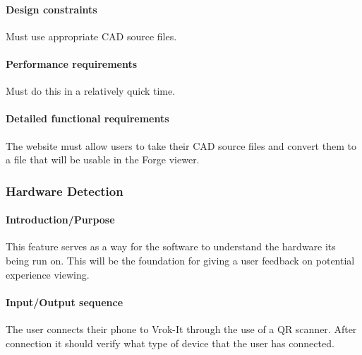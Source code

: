 \documentclass[letterpaper, 10pt, draftclsnofoot, compsoc, onecolumn]{IEEEtran}
\begin{document}
\paragraph[Design constraints]{\rmfamily\bfseries\color{black} Design
constraints }
{\color{black}
	Must use appropriate CAD source files. 
}

\paragraph[Performance requirements]{\rmfamily\bfseries\color{black}
Performance requirements }
{\color{black}
	Must do this in a relatively quick time.
}

\paragraph[Detailed functional requirements]{\rmfamily\bfseries\color{black}
Detailed functional requirements }
{\color{black}
	The website must allow users to take their CAD source files and convert them to a file that will be usable in the
	Forge viewer.    
}


\subsubsection[{Hardware Detection}]{\rmfamily\bfseries\color{black}  
	Hardware Detection
}
\smallskip
\paragraph[Introduction/Purpose of this
feature]{\rmfamily\bfseries\color{black}
Introduction/Purpose }
{\color{black}
	This feature serves as a way for the software to understand the hardware its being run on. This will be the foundation for 
	giving a user feedback on potential experience viewing.
}

\paragraph[Input/Output sequence]{\rmfamily\bfseries\color{black}
Input/Output sequence }
{\color{black}
	The user connects their phone to Vrok-It through the use of a QR scanner. After connection it should verify what type of 
	device that the user has connected.
}
\end{document}
